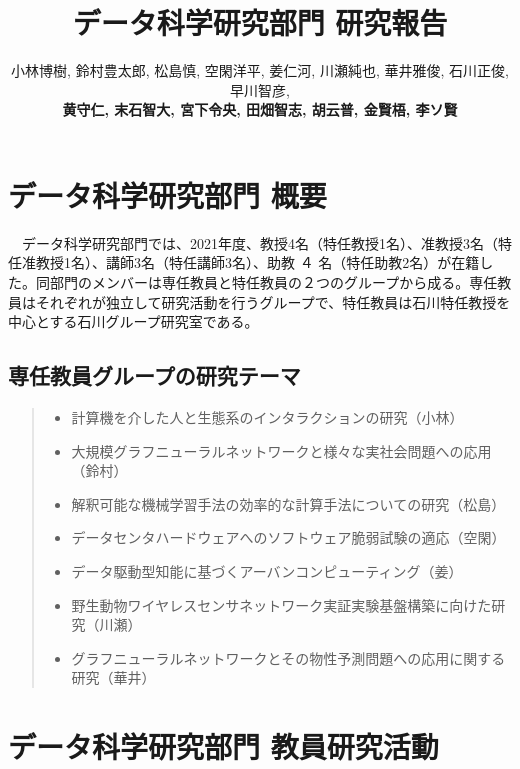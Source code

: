 \documentclass[11pt]{jarticle}
\title{データ科学研究部門 研究報告}
\author{小林博樹, 鈴村豊太郎, 松島慎, 空閑洋平, 姜仁河, 川瀬純也, 華井雅俊, 石川正俊, 早川智彦, \\
\textbf{黄守仁, 末石智大, 宮下令央, 田畑智志, 胡云普, 金賢梧, 李ソ賢}}
\begin{document}
\maketitle

\section{データ科学研究部門 概要}
　データ科学研究部門では、2021年度、教授4名（特任教授1名）、准教授3名（特任准教授1名）、講師3名（特任講師3名）、助教 ４ 名（特任助教2名）が在籍した。同部門のメンバーは専任教員と特任教員の２つのグループから成る。専任教員はそれぞれが独立して研究活動を行うグループで、特任教員は石川特任教授を中心とする石川グループ研究室である。


\subsection{専任教員グループの研究テーマ}

\begin{quote}
\begin{itemize}
\item 計算機を介した人と生態系のインタラクションの研究（小林）
\item 大規模グラフニューラルネットワークと様々な実社会問題への応用（鈴村）
\item 解釈可能な機械学習手法の効率的な計算手法についての研究（松島）
\item データセンタハードウェアへのソフトウェア脆弱試験の適応（空閑）
\item データ駆動型知能に基づくアーバンコンピューティング（姜）
\item 野生動物ワイヤレスセンサネットワーク実証実験基盤構築に向けた研究（川瀬）
\item グラフニューラルネットワークとその物性予測問題への応用に関する研究（華井）
\end{itemize}
\end{quote}



\section{データ科学研究部門 教員研究活動}
\end{document}
